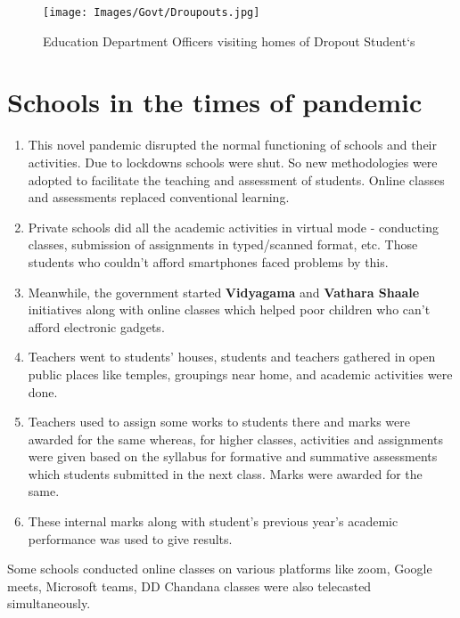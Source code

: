 \begin{figure}[H]
    \centering
    \texttt{[image: Images/Govt/Droupouts.jpg]}
    \caption*{Education Department Officers visiting homes of Dropout Student`s}
\end{figure}

\section{Schools in the times of pandemic}
\begin{enumerate}
    \item This novel pandemic disrupted the normal functioning of schools and their activities. Due to lockdowns schools were shut. So new methodologies were adopted to facilitate the teaching and assessment of students. Online classes and assessments replaced conventional learning.
    \item Private schools did all the academic activities in virtual mode - conducting classes, submission of assignments in typed/scanned format, etc. Those students who couldn't afford smartphones faced problems by this.
    \item Meanwhile, the government started \textbf{Vidyagama} and \textbf{Vathara Shaale} initiatives along with online classes which helped poor children who can't afford electronic gadgets. 
    \item Teachers went to students' houses, students and teachers gathered in open public places like temples, groupings near home, and academic activities were done. 
    \item Teachers used to assign some works to students there and marks were awarded for the same whereas, for higher classes, activities and assignments were given based on the syllabus for formative and summative assessments which students submitted in the next class. Marks were awarded for the same.
    \item  These internal marks along with student's previous year's academic performance was used to give results. 
\end{enumerate}

\begin{tcolorbox}[coltitle=black,colframe=yellow!90,fonttitle=\sffamily\bfseries\large,title=Online Classes]
Some schools conducted online classes on various platforms like zoom, Google meets, Microsoft teams, DD Chandana classes were also telecasted simultaneously.
\end{tcolorbox}

